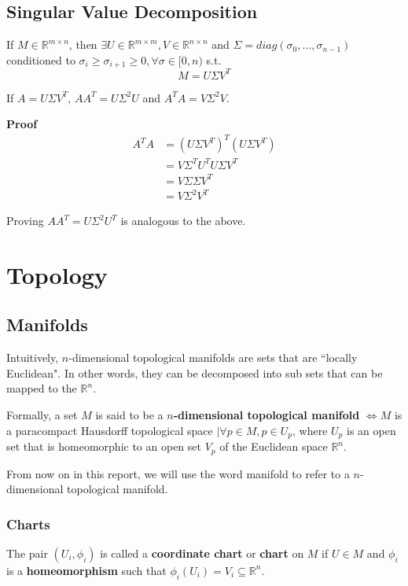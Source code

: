 \subsection{Singular Value Decomposition}
\label{sec:svd}
If $M \in \mathbb{R}^{m \times n}$, then $\exists U \in \mathbb{R}^{m \times m}, V \in \mathbb{R}^{n \times n}$ and $\Sigma =  diag(\sigma_0, \dots, \sigma_{n-1})$ conditioned to $\sigma_i \ge \sigma_{i+1} \ge 0, \forall \sigma \in [0, n)$ s.t. \cite{gan2008}
$$M = U\Sigma V^T$$

\begin{theorem}
	\label{th:svd-aat}
	If $A = U \Sigma V^T$, $AA^T = U \Sigma^2 U$ and $A^TA = V \Sigma^2 V$.
\end{theorem}
\textbf{Proof}
\begin{align*}
	A^TA &= (U\Sigma V^T)^T(U\Sigma V^T) \\
	&= V \Sigma^T U^T U \Sigma V^T \\
	&= V \Sigma \Sigma V^T \\
	&= V \Sigma^2 V^T
\end{align*}

Proving $AA^T = U \Sigma^2 U^T$ is analogous to the above.

\section{Topology}
\subsection{Manifolds}

Intuitively, $n$-dimensional topological manifolds are sets that are ``locally Euclidean". \cite{lee2009} In other words, they can be decomposed into sub sets that can be mapped to the $\mathbb{R}^n$.

Formally, a set $M$ is said to be a \textbf{$n$-dimensional topological manifold} $\iff M$ is a paracompact Hausdorff topological space $\mid \forall p \in M, p \in U_p$, where $U_p$ is an open set that is homeomorphic to an open set $V_p$ of the Euclidean space $\mathbb{R}^n$. \cite{lee2009}

From now on in this report, we will use the word manifold to refer to a $n$-dimensional topological manifold.

\subsubsection{Charts}
The pair $(U_i, \phi_i)$ is called a \textbf{coordinate chart} or \textbf{chart} on $M$ if $U \in M$ and $\phi_i$ is a \textbf{homeomorphism} such that $\phi_i(U_i) = V_i \subseteq \mathbb{R}^n$. \cite{lee2002}

